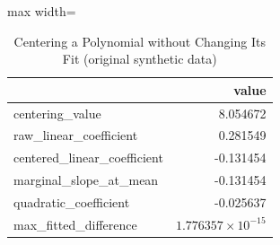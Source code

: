 \begin{table}[htbp]
\centering
\caption{Centering a Polynomial without Changing Its Fit (original synthetic data)}
\begingroup
\small
\setlength{\tabcolsep}{6pt}
\renewcommand{\arraystretch}{1.12}
\begin{adjustbox}{max width=\linewidth}
\begin{tabular}{@{}lr@{}}
\toprule
 & value \\
\midrule
centering\_value & 8.054672 \\
raw\_linear\_coefficient & 0.281549 \\
centered\_linear\_coefficient & -0.131454 \\
marginal\_slope\_at\_mean & -0.131454 \\
quadratic\_coefficient & -0.025637 \\
max\_fitted\_difference & $1.776357 \times 10^{-15}$ \\
\bottomrule
\end{tabular}
\end{adjustbox}
\endgroup
\end{table}